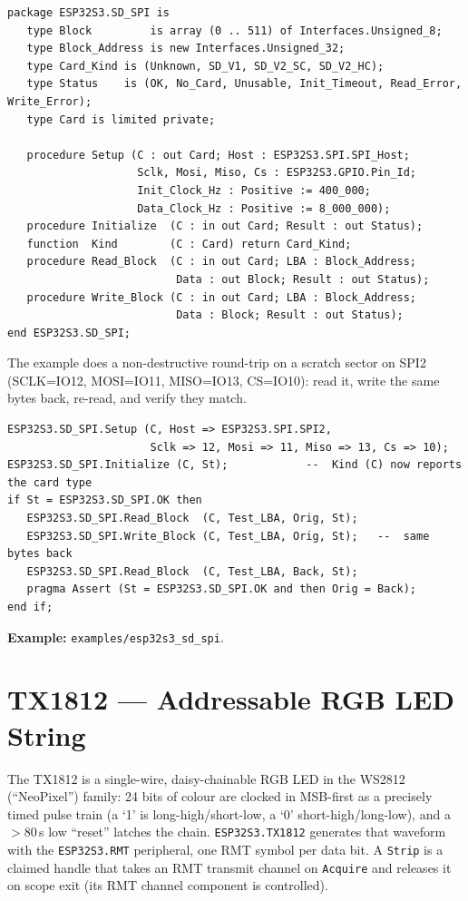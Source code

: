 \begin{lstlisting}
package ESP32S3.SD_SPI is
   type Block         is array (0 .. 511) of Interfaces.Unsigned_8;
   type Block_Address is new Interfaces.Unsigned_32;
   type Card_Kind is (Unknown, SD_V1, SD_V2_SC, SD_V2_HC);
   type Status    is (OK, No_Card, Unusable, Init_Timeout, Read_Error, Write_Error);
   type Card is limited private;

   procedure Setup (C : out Card; Host : ESP32S3.SPI.SPI_Host;
                    Sclk, Mosi, Miso, Cs : ESP32S3.GPIO.Pin_Id;
                    Init_Clock_Hz : Positive := 400_000;
                    Data_Clock_Hz : Positive := 8_000_000);
   procedure Initialize  (C : in out Card; Result : out Status);
   function  Kind        (C : Card) return Card_Kind;
   procedure Read_Block  (C : in out Card; LBA : Block_Address;
                          Data : out Block; Result : out Status);
   procedure Write_Block (C : in out Card; LBA : Block_Address;
                          Data : Block; Result : out Status);
end ESP32S3.SD_SPI;
\end{lstlisting}

The example does a non-destructive round-trip on a scratch sector on SPI2
(SCLK=IO12, MOSI=IO11, MISO=IO13, CS=IO10): read it, write the same bytes back,
re-read, and verify they match.

\begin{lstlisting}
ESP32S3.SD_SPI.Setup (C, Host => ESP32S3.SPI.SPI2,
                      Sclk => 12, Mosi => 11, Miso => 13, Cs => 10);
ESP32S3.SD_SPI.Initialize (C, St);            --  Kind (C) now reports the card type
if St = ESP32S3.SD_SPI.OK then
   ESP32S3.SD_SPI.Read_Block  (C, Test_LBA, Orig, St);
   ESP32S3.SD_SPI.Write_Block (C, Test_LBA, Orig, St);   --  same bytes back
   ESP32S3.SD_SPI.Read_Block  (C, Test_LBA, Back, St);
   pragma Assert (St = ESP32S3.SD_SPI.OK and then Orig = Back);
end if;
\end{lstlisting}

\noindent\textbf{Example:} \texttt{examples/esp32s3\_sd\_spi}.

\section{TX1812 --- Addressable RGB LED String}
\label{app:ext:tx1812}

The TX1812 is a single-wire, daisy-chainable RGB LED in the WS2812 (``NeoPixel'')
family: 24 bits of colour are clocked in MSB-first as a precisely timed pulse train
(a `1' is long-high/short-low, a `0' short-high/long-low), and a $>$80\,\textmu s
low ``reset'' latches the chain. \texttt{ESP32S3.TX1812} generates that waveform
with the \texttt{ESP32S3.RMT} peripheral, one RMT symbol per data bit. A
\texttt{Strip} is a claimed handle that takes an RMT transmit channel on
\texttt{Acquire} and releases it on scope exit (its RMT channel component is
controlled).

